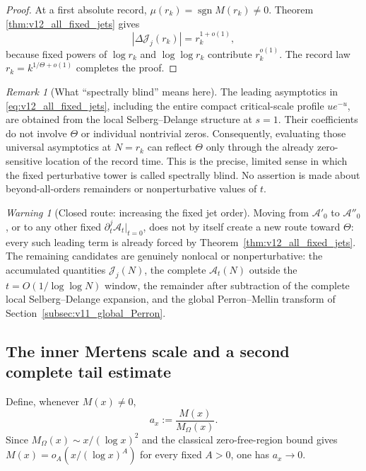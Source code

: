 \documentclass[11pt]{amsart}
\numberwithin{equation}{section}
\theoremstyle{plain}
\theoremstyle{definition}
\theoremstyle{remark}
\newtheorem{remark}[theorem]{Remark}
\newtheorem{warning}[theorem]{Warning}
\begin{document}
\begin{proof}
At a first absolute record,
\(\mu(r_k)=\operatorname{sgn}M(r_k)\ne0\).  Theorem
\ref{thm:v12_all_fixed_jets} gives
\begin{equation}
|\Delta\mathcal J_j(r_k)|
=
 r_k^{1+o(1)},
\label{eq:v12_Jj_record_rscale}
\end{equation}
because fixed powers of \(\log r_k\) and \(\log\log r_k\) contribute
\(r_k^{o(1)}\).  The record law
\(r_k=k^{1/\Theta+o(1)}\) completes the proof.
\end{proof}

\begin{remark}[What ``spectrally blind'' means here]
\label{rem:v12_blindness_meaning}
The leading asymptotics in
\eqref{eq:v12_all_fixed_jets}, including the entire compact critical-scale
profile \(ue^{-u}\), are obtained from the local Selberg--Delange structure at
\(s=1\).  Their coefficients do not involve \(\Theta\) or individual
nontrivial zeros.  Consequently, evaluating those universal asymptotics at
\(N=r_k\) can reflect \(\Theta\) only through the already zero-sensitive
location of the record time.  This is the precise, limited sense in which the
fixed perturbative tower is called spectrally blind.  No assertion is made
about beyond-all-orders remainders or nonperturbative values of \(t\).
\end{remark}

\begin{warning}[Closed route: increasing the fixed jet order]
\label{warn:v12_higher_jet_route_closed}
Moving from \(\mathcal A'_0\) to \(\mathcal A''_0\), or to any other fixed
\(\partial_t^j\mathcal A_t|_{t=0}\), does not by itself create a new route
toward \(\Theta\): every such leading term is already forced by
Theorem~\ref{thm:v12_all_fixed_jets}.  The remaining candidates are genuinely
nonlocal or nonperturbative: the accumulated quantities
\(\mathcal J_j(N)\), the complete \(\mathcal A_t(N)\) outside the
\(t=O(1/\log\log N)\) window, the remainder after subtraction of the complete
local Selberg--Delange expansion, and the global Perron--Mellin transform of
Section~\ref{subsec:v11_global_Perron}.
\end{warning}

\subsection{The inner Mertens scale and a second complete tail estimate}
\label{subsec:v11_inner_scale}

Define, whenever \(M(x)\ne0\),
\begin{equation}
a_x:=\frac{M(x)}{M_\Omega(x)}.
\label{eq:v11_ax}
\end{equation}
Since \(M_\Omega(x)\sim x/(\log x)^2\) and the classical zero-free-region
bound gives \(M(x)=o_A(x/(\log x)^A)\) for every fixed \(A>0\), one has
\(a_x\to0\).
\end{document}
